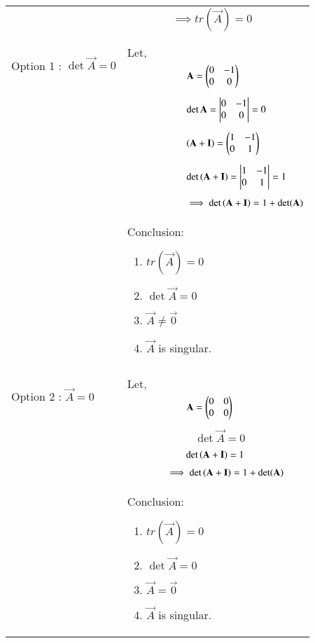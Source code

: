 \documentclass[journal,12pt]{IEEEtran}
\begin{document}
\begin{longtable}{|p{5cm}|p{13cm}|}
    &$\qquad\qquad\implies\boxed{ tr(\vec{A})=0}$\\
    &\\
    \hline
  	\multirow{3}{*}{Option 1 : $\det\vec{A}=0$ } 
	& \\
	& Let,\\
	& $\qquad\qquad\qquad\mathbf{A}=\begin{pmatrix}0&-1\\0&0\end{pmatrix}$\\
	&\\
	& $\qquad\qquad\qquad\det{\mathbf{A}} = \begin{vmatrix}0&-1\\0&0\end{vmatrix} = 0$\\
	&\\
	& $\qquad\qquad\qquad\left(\mathbf{A}+\mathbf{I}\right)=\begin{pmatrix}1&-1\\0&1\end{pmatrix}$\\
	&\\
	& $\qquad\qquad\qquad\det\left(\mathbf{A}+\mathbf{I}\right)=\begin{vmatrix}1&-1\\0&1\end{vmatrix}=1$\\
	&\\
	& $\qquad\qquad\qquad\implies\det\left(\mathbf{A}+\mathbf{I}\right)=1+\det(\mathbf{A
	})$\\
	& Conclusion: {\begin{enumerate}
	\item $tr(\vec{A})=0$
	\item $\det{\vec{A}}= 0$
	\item $\vec{A} \neq \vec{0}$
	\item $\vec{A}$ is  singular.\end{enumerate}}\\
	\hline
	\multirow{3}{*}{Option 2 : $\vec{A}=0$} & \\
	& Let,\\
	& $\qquad\qquad\qquad\mathbf{A}= \begin{pmatrix}0&0\\0&0\end{pmatrix}$\\
	&\\
    & $\qquad\qquad\qquad\det\vec{A}=0$\\
    &\\
    & $\qquad\qquad\qquad\det\left(\mathbf{A}+\mathbf{I}\right)=1$\\
    &\\
    & $\qquad\qquad\implies\det\left(\mathbf{A}+\mathbf{I}\right)=1+\det(\mathbf{A}) $\\
    & Conclusion: {\begin{enumerate}
	\item $tr(\vec{A})=0$
	\item $\det{\vec{A}}=0$
	\item $\vec{A}=\vec{0}$
	\item $\vec{A}$ is singular.\end{enumerate}}\\

\end{longtable}
\end{document}
